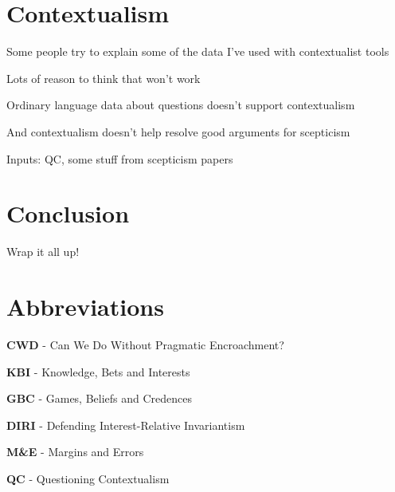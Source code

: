 \documentclass[11pt,oneside]{book}
\begin{document}
\section{Contextualism}
\label{contextualism}

\begin{itemize*}
\item Some people try to explain some of the data I've used with contextualist tools

\item Lots of reason to think that won't work

\item Ordinary language data about questions doesn't support contextualism

\item And contextualism doesn't help resolve good arguments for scepticism

\end{itemize*}
Inputs: QC, some stuff from scepticism papers

\section*{Conclusion}
Wrap it all up!

\section*{Abbreviations}
\begin{itemize*}
\item \textbf{CWD} - Can We Do Without Pragmatic Encroachment?
\item \textbf{KBI} - Knowledge, Bets and Interests
\item \textbf{GBC} - Games, Beliefs and Credences
\item \textbf{DIRI} - Defending Interest-Relative Invariantism
\item \textbf{M\&E} - Margins and Errors
\item \textbf{QC} - Questioning Contextualism
\end{itemize*}

\noindent 
\end{document}
